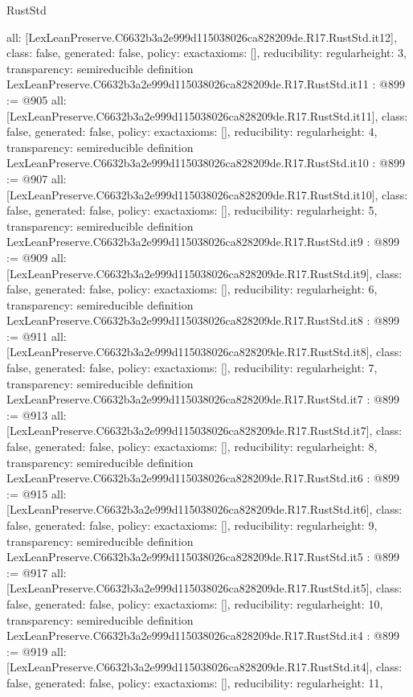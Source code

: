 \begin{lexlean}{RustStd}
\begin{coremodule}
{  all: [LexLeanPreserve.C6632b3a2e999d115038026ca828209de.R17.RustStd.it12],
  class: false,
  generated: false,
  policy: exact{axioms: []},
  reducibility: regular{height: 3},
  transparency: semireducible
}
definition LexLeanPreserve.C6632b3a2e999d115038026ca828209de.R17.RustStd.it11 : @899 := @905 {
  all: [LexLeanPreserve.C6632b3a2e999d115038026ca828209de.R17.RustStd.it11],
  class: false,
  generated: false,
  policy: exact{axioms: []},
  reducibility: regular{height: 4},
  transparency: semireducible
}
definition LexLeanPreserve.C6632b3a2e999d115038026ca828209de.R17.RustStd.it10 : @899 := @907 {
  all: [LexLeanPreserve.C6632b3a2e999d115038026ca828209de.R17.RustStd.it10],
  class: false,
  generated: false,
  policy: exact{axioms: []},
  reducibility: regular{height: 5},
  transparency: semireducible
}
definition LexLeanPreserve.C6632b3a2e999d115038026ca828209de.R17.RustStd.it9 : @899 := @909 {
  all: [LexLeanPreserve.C6632b3a2e999d115038026ca828209de.R17.RustStd.it9],
  class: false,
  generated: false,
  policy: exact{axioms: []},
  reducibility: regular{height: 6},
  transparency: semireducible
}
definition LexLeanPreserve.C6632b3a2e999d115038026ca828209de.R17.RustStd.it8 : @899 := @911 {
  all: [LexLeanPreserve.C6632b3a2e999d115038026ca828209de.R17.RustStd.it8],
  class: false,
  generated: false,
  policy: exact{axioms: []},
  reducibility: regular{height: 7},
  transparency: semireducible
}
definition LexLeanPreserve.C6632b3a2e999d115038026ca828209de.R17.RustStd.it7 : @899 := @913 {
  all: [LexLeanPreserve.C6632b3a2e999d115038026ca828209de.R17.RustStd.it7],
  class: false,
  generated: false,
  policy: exact{axioms: []},
  reducibility: regular{height: 8},
  transparency: semireducible
}
definition LexLeanPreserve.C6632b3a2e999d115038026ca828209de.R17.RustStd.it6 : @899 := @915 {
  all: [LexLeanPreserve.C6632b3a2e999d115038026ca828209de.R17.RustStd.it6],
  class: false,
  generated: false,
  policy: exact{axioms: []},
  reducibility: regular{height: 9},
  transparency: semireducible
}
definition LexLeanPreserve.C6632b3a2e999d115038026ca828209de.R17.RustStd.it5 : @899 := @917 {
  all: [LexLeanPreserve.C6632b3a2e999d115038026ca828209de.R17.RustStd.it5],
  class: false,
  generated: false,
  policy: exact{axioms: []},
  reducibility: regular{height: 10},
  transparency: semireducible
}
definition LexLeanPreserve.C6632b3a2e999d115038026ca828209de.R17.RustStd.it4 : @899 := @919 {
  all: [LexLeanPreserve.C6632b3a2e999d115038026ca828209de.R17.RustStd.it4],
  class: false,
  generated: false,
  policy: exact{axioms: []},
  reducibility: regular{height: 11},
}
\end{coremodule}
\end{lexlean}
